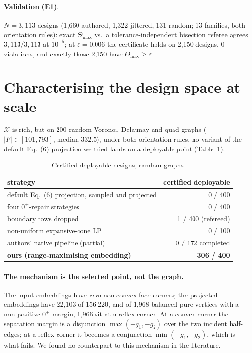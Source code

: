 \documentclass[sigconf,screen]{acmart}
\begin{document}
\paragraph{Validation (E1).} $N=3{,}113$ designs (1{,}660 authored, 1{,}322
jittered, 131 random; 13 families, both orientation rules): exact
$\Theta_{\max}$ vs.\ a tolerance-independent bisection referee agrees
$3{,}113/3{,}113$ at $10^{-5}$; at $\varepsilon=0.006$ the certificate holds on
2{,}150 designs, 0 violations, and exactly those 2{,}150 have
$\Theta_{\max}\ge\varepsilon$.

\section{Characterising the design space at scale}

$\mathcal{X}$ is rich, but on 200 random Voronoi, Delaunay and quad graphs
($|F|\in[101,793]$, median $332.5$), under both orientation rules, no variant of
the default Eq.~(6) projection we tried lands on a deployable point
(Table~\ref{tab:baseline}).

\begin{table}[t]
  \caption{Certified deployable designs, random graphs.}
  \label{tab:baseline}
  \footnotesize
  \begin{tabular}{lr}
    \toprule
    strategy & certified deployable \\
    \midrule
    default Eq.~(6) projection, sampled and projected & 0 / 400 \\
    four $0^{+}$-repair strategies & 0 / 400 \\
    boundary rows dropped & 1 / 400 (refereed) \\
    non-uniform expansive-cone LP & 0 / 100 \\
    authors' native pipeline (partial) & 0 / 172 completed \\
    \midrule
    \textbf{ours (range-maximising embedding)} & \textbf{306 / 400} \\
    \bottomrule
  \end{tabular}
\end{table}

\paragraph{The mechanism is the selected point, not the graph.} The input embeddings
have \emph{zero} non-convex face corners; the projected embeddings have 22{,}103
of 156{,}220, and of 1{,}968 balanced pure vertices with a non-positive $0^{+}$
margin, 1{,}966 sit at a reflex corner. At a convex corner the separation margin
is a disjunction $\max(-g_1,-g_2)$ over the two incident half-edges; at a reflex
corner it becomes a conjunction $\min(-g_1,-g_2)$, which is what fails. We found
no counterpart to this mechanism in the literature.
\end{document}
